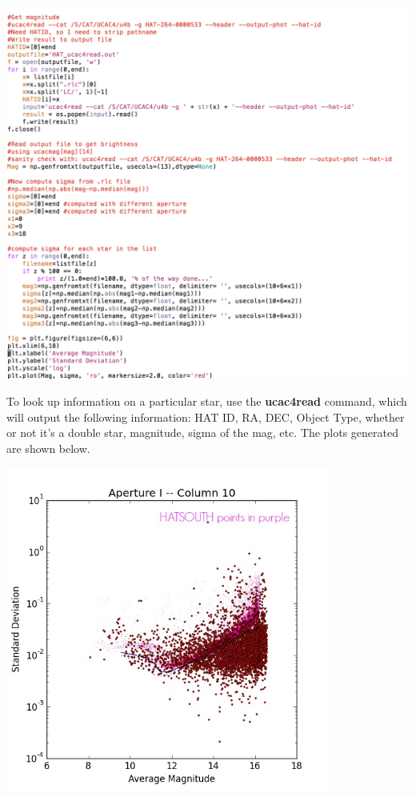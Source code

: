 \documentclass[11pt,letterpaper]{book} %
\begin{document}
\begin{center}
\includegraphics[width=\textwidth]{StndVMag.png}\\ 
\end{center}
To look up information on a particular star, use the \textbf{ucac4read} command, which will output the following information: HAT ID, RA, DEC, Object Type, whether or not it's a double star, magnitude, sigma of the mag, etc. 
The plots generated are shown below.
\begin{center}
\includegraphics[width=0.8\textwidth]{Mag_Sigma1_comp.jpg}\\ 
\end{center}
\end{document}
